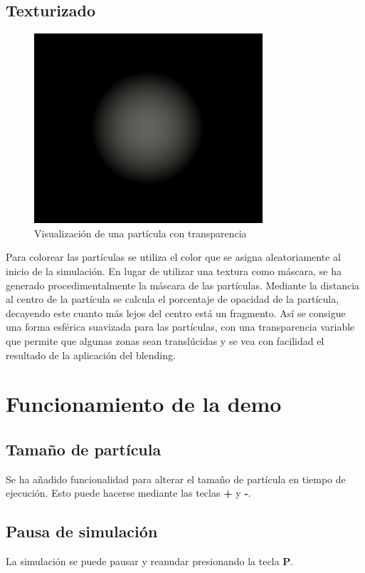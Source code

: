\documentclass[10pt,oneside,a4paper]{article}
\begin{document}
\subsection{Texturizado}

\begin{figure}[h!tbp]
\centering
\includegraphics[width=.8\linewidth]{img/proceduraltexture.png}
\caption{Visualización de una partícula con transparencia}
\end{figure}
Para colorear las partículas se utiliza el color que se asigna aleatoriamente al inicio de la simulación. En lugar de utilizar una textura como máscara, se ha generado procedimentalmente la máscara de las partículas. Mediante la distancia al centro de la partícula se calcula el porcentaje de opacidad de la partícula, decayendo este cuanto más lejos del centro está un fragmento. Así se consigue una forma esférica suavizada para las partículas, con una transparencia variable que permite que algunas zonas sean translúcidas y se vea con facilidad el resultado de la aplicación del blending.

\section{Funcionamiento de la demo}
\subsection{Tamaño de partícula}
Se ha añadido funcionalidad para alterar el tamaño de partícula en tiempo de ejecución. Esto puede hacerse mediante las teclas \textbf{+} y \textbf{-}.

\subsection{Pausa de simulación}
La simulación se puede pausar y reanudar presionando la tecla \textbf{P}.
\end{document}
